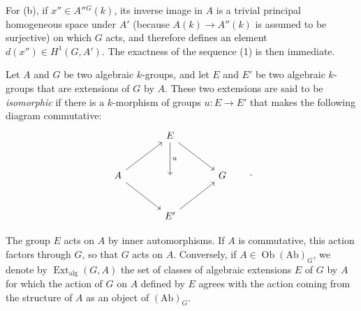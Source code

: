 For (b), if \(x''\in A''{}^G(k)\), its inverse image in \(A\)
is a trivial principal homogeneous space under \(A'\) (because
\(A(k)\to A''(k)\) is assumed to be surjective) on which \(G\)
acts, and therefore defines an element
\(d(x'')\in H^1(G,A')\).  The exactness of the sequence (1) is
then immediate.


Let \(A\) and \(G\) be two algebraic \(k\)-groups, and let \(E\)
and \(E'\) be two algebraic \(k\)-groups that are extensions of
\(G\) by \(A\).  These two extensions are said to be
\emph{isomorphic} if there is a \(k\)-morphism of groups
\(u:E\to E'\) that makes the following diagram commutative:
\[
\begin{tikzcd}[column sep=large,row sep=large]
  {} & E \arrow[dr] \arrow[d,"u"] & {} \\
  A \arrow[ur] \arrow[dr] & {} & G \\
  {} & E' \arrow[ur] & {}
\end{tikzcd}
\qquad .
\]

The group \(E\) acts on \(A\) by inner automorphisms.  If \(A\)
is commutative, this action factors through \(G\), so that \(G\)
acts on \(A\).  Conversely, if
\(A\in\operatorname{Ob}(\mathrm{Ab})_G\), we denote by
\(\operatorname{Ext}_{\mathrm{alg}}(G,A)\) the set of classes of
algebraic extensions \(E\) of \(G\) by \(A\) for which the
action of \(G\) on \(A\) defined by \(E\) agrees with the action
coming from the structure of \(A\) as an object of
\((\mathrm{Ab})_G\).

